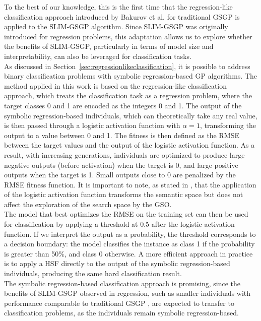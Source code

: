 \documentclass[manuscript, review, anonymous]{acmart} %
\begin{document}
To the best of our knowledge, this is the first time that the regression-like classification approach introduced by Bakurov et al. \cite{Bakurov2019} 
for traditional GSGP is applied to the SLIM-GSGP algorithm. Since SLIM-GSGP was originally introduced for regression problems, 
this adaptation allows us to explore whether the benefits of SLIM-GSGP, particularly 
in terms of model size and interpretability, can also be leveraged for classification tasks.\\
As discussed in Section~\ref{sec:regressionlikeclassification}, it is 
possible to address binary classification problems with symbolic regression-based GP algorithms.
The method applied in this work is based on the regression-like classification
approach, which treats the classification task as a regression problem,
where the target classes 0 and 1 are encoded as the integers 0 and 1. 
The output of the symbolic regression-based individuals, which can theoretically take any real value,
is then passed through a logistic activation function with $\alpha = 1$, transforming the output to a value between 0 and 1.
The fitness is then defined as the RMSE between the target values and the output of the logistic activation function.
As a result, with increasing generations, individuals are optimized to produce large negative outputs (before activation) when the target is 0, 
and large positive outputs when the target is 1. Small outputs close to 0 are penalized by the RMSE fitness function.
It is important to note, as stated in \cite{Bakurov2022}, that the application of the logistic activation function 
transforms the semantic space but does not affect the exploration of the search space by the GSO.\\
The model that best optimizes the RMSE on the training set 
can then be used for classification by applying a threshold at 0.5 after the logistic activation function.
If we interpret the output as a probability, the threshold corresponds to a decision boundary: 
the model classifies the instance as class 1 if the probability is greater than 50\%, and class 0 otherwise.
A more efficient approach in practice is to apply a HSF directly to the output of the symbolic regression-based 
individuals, producing the same hard classification result.\\
The symbolic regression-based classification approach is promising, 
since the benefits of SLIM-GSGP observed in regression, such as smaller individuals 
with performance comparable to traditional GSGP \cite{Vanneschi2024},
are expected to transfer to classification problems, as the individuals remain symbolic regression-based.
\end{document}
